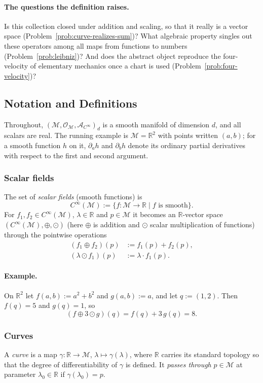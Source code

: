 \documentclass[11pt]{article}
\newcommand{\Cinf}{C^\infty(\mathcal M)}
\begin{document}
\paragraph{The questions the definition raises.}
Is this collection closed under addition and scaling, so that it really is a vector space (Problem~\ref{prob:curve-realizes-sum})? What algebraic property singles out these operators among all maps from functions to numbers (Problem~\ref{prob:leibniz})? And does the abstract object reproduce the four-velocity of elementary mechanics once a chart is used (Problem~\ref{prob:four-velocity})?

\subsection*{Notation and Definitions}

\noindent Throughout, $(\mathcal M,\mathcal O_{\mathcal M},\mathcal A_{C^\infty})_d$ is a smooth manifold of dimension $d$, and all scalars are real. The running example is $\mathcal M=\mathbb R^2$ with points written $(a,b)$; for a smooth function $h$ on it, $\partial_ah$ and $\partial_bh$ denote its ordinary partial derivatives with respect to the first and second argument.

\subsubsection*{Scalar fields}
The set of \emph{scalar fields} (smooth functions) is
\[
\Cinf:=\{f:\mathcal M\to\mathbb R\mid f\text{ is smooth}\}.
\]
For $f_1,f_2\in\Cinf$, $\lambda\in\mathbb R$ and $p\in\mathcal M$ it becomes an $\mathbb R$-vector space $(\Cinf,\oplus,\odot)$ (here $\oplus$ is addition and $\odot$ scalar multiplication of functions) through the pointwise operations
\begin{align*}
(f_1\oplus f_2)(p)&:=f_1(p)+f_2(p),\\
(\lambda\odot f_1)(p)&:=\lambda\cdot f_1(p).
\end{align*}
\paragraph{Example.} On $\mathbb R^2$ let $f(a,b):=a^2+b^2$ and $g(a,b):=a$, and let $q:=(1,2)$. Then $f(q)=5$ and $g(q)=1$, so
\[
(f\oplus3\odot g)(q)=f(q)+3\,g(q)=8.
\]

\subsubsection*{Curves}
A \emph{curve} is a map $\gamma:\mathbb R\to\mathcal M$, $\lambda\mapsto\gamma(\lambda)$, where $\mathbb R$ carries its standard topology so that the degree of differentiability of $\gamma$ is defined. It \emph{passes through} $p\in\mathcal M$ at parameter $\lambda_0\in\mathbb R$ if $\gamma(\lambda_0)=p$.
\end{document}
